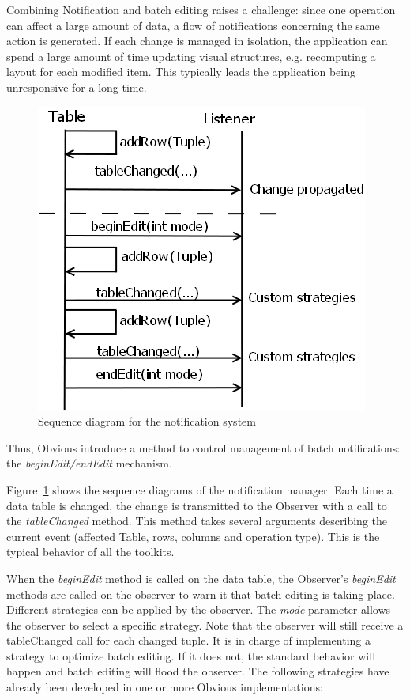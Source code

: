 \label{sub:combiningnotif}

Combining Notification and batch editing raises a challenge: since one
operation can affect a large amount of data, a flow of notifications
concerning the same action is generated.  If each change is managed in
isolation, the application can spend a large amount of time updating
visual structures, e.g. recomputing a layout for each modified item.
This typically leads the application being unresponsive for a long time.

\begin{figure}[!ht]
  \centering
  \includegraphics[width=.7\columnwidth]{figures/notification}
  \caption{Sequence diagram for the notification system}
  \label{fig:notification}
\end{figure}

Thus, Obvious introduce a method to control management of batch
notifications: the \emph{beginEdit/endEdit} mechanism.  

Figure~\ref{fig:notification} shows the sequence diagrams of the
notification manager.  Each time a data table is changed, the change
is transmitted to the Observer with a call to the \emph{tableChanged}
method.  This method takes several arguments describing the current
event (affected Table, rows, columns and operation type).  This is the
typical behavior of all the toolkits.

When the \emph{beginEdit} method is called on the data table, the
Observer's \emph{beginEdit} methods are called on the observer to warn
it that batch editing is taking place.  Different strategies can be
applied by the observer.  The \emph{mode} parameter allows the
observer to select a specific strategy.  Note that the observer will
still receive a tableChanged call for each changed tuple. It is in
charge of implementing a strategy to optimize batch editing. If it
does not, the standard behavior will happen and batch editing will
flood the observer.  The following strategies have already been
developed in one or more Obvious implementations:

